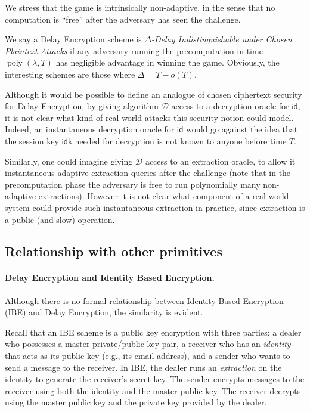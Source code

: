\documentclass{llncs}
\DeclareMathOperator{\poly}{poly}
\newcommand{\id}{\mathsf{id}}
\newcommand{\idk}{\mathsf{idk}}
\begin{document}
We stress that the game is intrinsically non-adaptive, in the sense
that no computation is ``free'' after the adversary has seen the
challenge.

We say a Delay Encryption scheme is \emph{$\Delta$-Delay
  Indistinguishable under Chosen Plaintext Attacks} if any
adversary running the precomputation in time
$\poly(\lambda,T)$ has negligible advantage in winning the game. %
Obviously, the interesting schemes are those where $\Delta = T-o(T)$.

\begin{remark}
  Although it would be possible to define an analogue of chosen
  ciphertext security for Delay Encryption, by giving algorithm
  $\mathcal{D}$ access to a decryption oracle for $\id$, it is not
  clear what kind of real world attacks this security notion could
  model. Indeed, an instantaneous decryption oracle for $\id$ would go
  against the idea that the session key $\idk$ needed for decryption
  is not known to anyone before time $T$.

  Similarly, one could imagine giving $\mathcal{D}$ access to an
  extraction oracle, to allow it instantaneous adaptive extraction
  queries after the challenge (note that in the precomputation phase
  the adversary is free to run polynomially many non-adaptive
  extractions). However it is not clear what component of a real world
  system could provide such instantaneous extraction in practice,
  since extraction is a public (and slow) operation.
\end{remark}


\subsection{Relationship with other primitives}

\paragraph{Delay Encryption and Identity Based Encryption.}
Although there is no formal relationship between Identity Based
Encryption (IBE) and Delay Encryption, the similarity is evident. 

Recall that an IBE scheme is a public key encryption with three
parties: a dealer who possesses a master private/public key pair, a
receiver who has an \emph{identity} that acts as its public key (e.g.,
its email address), and a sender who wants to send a message to the
receiver. %
In IBE, the dealer runs an \emph{extraction} on the identity to
generate the receiver's secret key. %
The sender encrypts messages to the receiver using both the identity
and the master public key. %
The receiver decrypts using the master public key and the private key
provided by the dealer.
\end{document}
